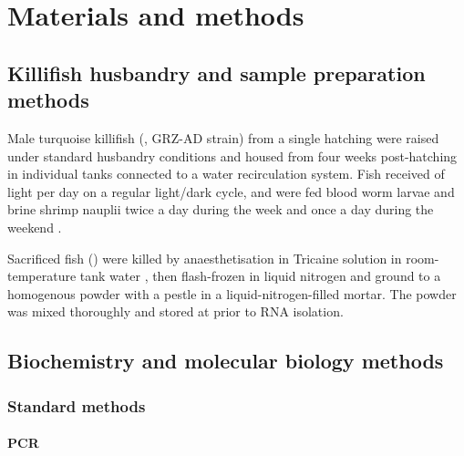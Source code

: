 
\chapter{Materials and methods}  
\onehalfspacing

\pagebreak


\section{Killifish husbandry and sample preparation methods}
\label{sec:methods_husbandry}

Male turquoise killifish (\nfu, GRZ-AD strain) from a single hatching were raised under standard husbandry conditions \parencite{dodzian2018husbandry} and housed from four weeks post-hatching in individual  tanks connected to a water recirculation system. Fish received  of light per day on a regular light/dark cycle, and were fed blood
worm larvae and brine shrimp nauplii twice a day during the week and once a day during the weekend \parencite{dodzian2018husbandry,smith2017microbiota}.

Sacrificed fish () were killed by anaesthetisation in  Tricaine solution in room-temperature tank water \parencite{carter2011tricaine}, then flash-frozen in liquid nitrogen and ground to a homogenous powder with a pestle in a liquid-nitrogen-filled mortar. The powder was mixed thoroughly and stored at  prior to RNA isolation.


\section{Biochemistry and molecular biology methods}

\subsection{Standard methods}

\subsubsection{PCR}
\label{sec:methods_molec_standard_pcr}

